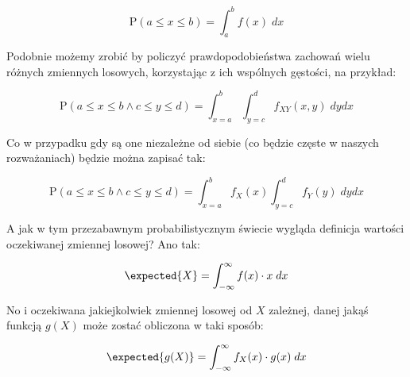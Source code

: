 \[
	\mathrm{P}(a \leq x \leq b) = \int_{a}^{b} f(x) \; dx
\]

Podobnie możemy zrobić by policzyć prawdopodobieństwa zachowań wielu różnych zmiennych losowych, korzystając z ich wspólnych gęstości, na przykład:

\[
	\mathrm{P}(a \leq x \leq b \land c \leq y \leq d) = \int_{x=a}^{b}\int_{y=c}^{d} f_{XY}(x,y) \; dydx
\]

Co w przypadku gdy są one niezależne od siebie (co będzie częste w naszych rozważaniach) będzie można zapisać tak:

\[
	\mathrm{P}(a \leq x \leq b \land c \leq y \leq d) = \int_{x=a}^{b} f_{X}(x)\int_{y=c}^{d} f_{Y}(y) \; dydx
\]

A jak w tym przezabawnym probabilistycznym świecie wygląda definicja wartości oczekiwanej zmiennej losowej? Ano tak:

\[
	\expected{X} = \int_{-\infty}^{\infty} f(x) \cdot x \; dx
\]

No i oczekiwana jakiejkolwiek zmiennej losowej od \(X\) zależnej, danej jakąś funkcją \(g(X)\) może zostać obliczona w taki sposób:

\[
	\expected{g(X)} = \int_{-\infty}^{\infty} f_{X}(x) \cdot g(x) \; dx
\]
